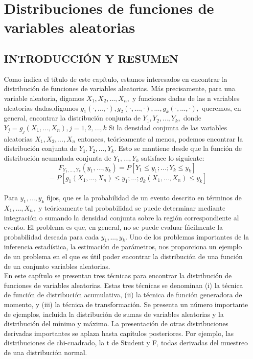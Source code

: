  \chapter{Distribuciones de funciones de variables aleatorias}

 \section{INTRODUCCIÓN Y RESUMEN}

Como indica el título de este capítulo, estamos interesados en encontrar la distribución de funciones de variables aleatorias. Más precisamente, para una variable aleatoria, digamos $X_{1}, X_{2}, \ldots, X_{n},$ y funciones dadas de las n variables aleatorias dadas,digamos $g_{1}(\cdot, \ldots, \cdot), g_{2}(\cdot, \ldots, \cdot), \ldots, g_{k}(\cdot, \ldots, \cdot),$ queremos, en general, encontrar la distribución conjunta de $Y_{1}, Y_{2}, \ldots, Y_{k},$ donde $Y_{j}=g_{j}\left(X_{1}, \ldots, X_{n}\right), j=1,2, \ldots, k$
Si la densidad conjunta de las variables aleatorias $X_{1}, X_{2}, \ldots, X_{n}$  entonces, teóricamente al menos, podemos encontrar la distribución conjunta de $Y_{1}, Y_{2}, \ldots, Y_{k}$. Esto se mantiene desde que la función de distribución acumulada conjunta de $Y_{1}, \ldots, Y_{k}$ satisface lo siguiente:
$$
F_{Y_{1}, \ldots, Y_{k}}\left(y_{1}, \ldots, y_{k}\right)=P\left[Y_{1} \leq y_{1} ; \ldots ; Y_{k} \leq y_{k}\right]
$$
$$=P\left[g_{1}\left(X_{1}, \ldots, X_{n}\right) \leq y_{1} ; \ldots ; g_{k}\left(X_{1}, \ldots, X_{n}\right) \leq y_{k}\right]$$
\\
Para $y_{1}, \ldots, y_{k}$ fijos, que es la probabilidad de un evento descrito en términos de $X_{1}, \ldots, X_{n},$ y teóricamente tal probabilidad se puede determinar mediante integración o sumando la densidad conjunta sobre la región correspondiente al evento. El problema es que, en general, no se puede evaluar fácilmente la probabilidad deseada para cada $y_{1}, \ldots, y_{k} .$ Uno de los problemas importantes de la inferencia estadística, la estimación de parámetros, nos proporciona un ejemplo de un problema en el que es útil poder encontrar la distribución de una función de un conjunto variables aleatorias.\\

En este capítulo se presentan tres técnicas para encontrar la distribución de funciones de variables aleatorias. Estas tres técnicas se denominan (i) la técnica de función de distribución acumulativa, (ii) la técnica de función generadora de momento, y (iii) la técnica de transformación. Se presenta un número importante de ejemplos, incluida la distribución de sumas de variables aleatorias y la distribución del mínimo y máximo. La presentación de otras distribuciones derivadas importantes se aplaza hasta capítulos posteriores. Por ejemplo, las distribuciones de chi-cuadrado, la t de Student y F, todas derivadas del muestreo de una distribución normal.\\


